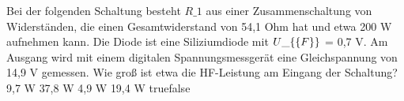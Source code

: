     {Bei der folgenden Schaltung besteht $R\_1$ aus einer Zusammenschaltung von Widerständen, die einen Gesamtwiderstand von 54,1 Ohm hat und etwa 200 W aufnehmen kann. Die Diode ist eine Siliziumdiode mit $U\_\{\textrm\{F\}\}$ = 0,7 V. Am Ausgang wird mit einem digitalen Spannungsmessgerät eine Gleichspannung von 14,9 V gemessen. Wie groß ist etwa die HF-Leistung am Eingang der Schaltung?}
    {9,7 W}
    {37,8 W}
    {4,9 W}
    {19,4 W}
    {true}{false}